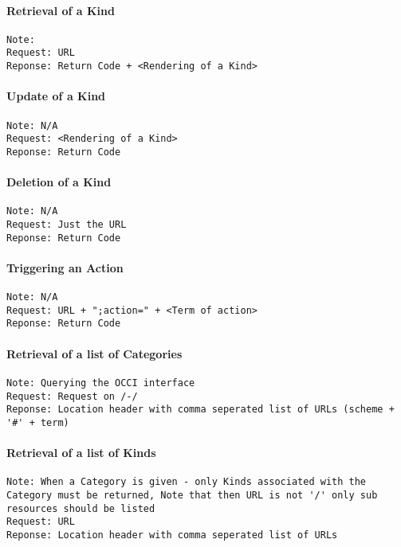 \documentclass[10pt,a4paper]{article}
\begin{document}
\paragraph{Retrieval of a Kind}
\begin{verbatim}
Note: 
Request: URL
Reponse: Return Code + <Rendering of a Kind>
\end{verbatim}

\paragraph{Update of a Kind}
\begin{verbatim}
Note: N/A
Request: <Rendering of a Kind>
Reponse: Return Code
\end{verbatim}

\paragraph{Deletion of a Kind}
\begin{verbatim}
Note: N/A
Request: Just the URL
Reponse: Return Code
\end{verbatim}

\paragraph{Triggering an Action}
\begin{verbatim}
Note: N/A
Request: URL + ";action=" + <Term of action>
Reponse: Return Code
\end{verbatim}

\paragraph{Retrieval of a list of Categories}
\begin{verbatim}
Note: Querying the OCCI interface
Request: Request on /-/
Reponse: Location header with comma seperated list of URLs (scheme + '#' + term)
\end{verbatim}

\paragraph{Retrieval of a list of Kinds}
\begin{verbatim}
Note: When a Category is given - only Kinds associated with the Category must be returned, Note that then URL is not '/' only sub resources should be listed
Request: URL
Reponse: Location header with comma seperated list of URLs
\end{verbatim}
\end{document}
